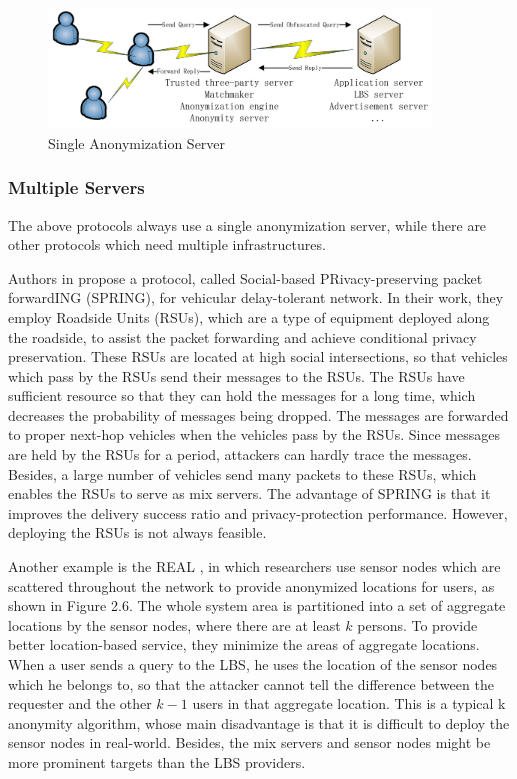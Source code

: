 \begin{figure} [H]
  \centering 
  \includegraphics[width=4.0in]{figures/Fig_Single_Ano_Ser.png}
  \caption{Single Anonymization Server} 
  \label{fig:SingleAnoymizationServer} %
\end{figure}

\subsubsection{ Multiple Servers}

\noindent The above protocols always use a single anonymization server, while there are other protocols which need multiple infrastructures. 

Authors in \cite{C25} propose a protocol, called Social-based PRivacy-preserving packet forwardING (SPRING), for vehicular delay-tolerant network. In their work, they employ Roadside Units (RSUs), which are a type of equipment deployed along the roadside, to assist the packet forwarding and achieve conditional privacy preservation. These RSUs are located at high social intersections, so that vehicles which pass by the RSUs send their messages to the RSUs. The RSUs have sufficient resource so that they can hold the messages for a long time, which decreases the probability of messages being dropped. The messages are forwarded to proper next-hop vehicles when the vehicles pass by the RSUs. Since messages are held by the RSUs for a period, attackers can hardly trace the messages. Besides, a large number of vehicles send many packets to these RSUs, which enables the RSUs to serve as mix servers. The advantage of SPRING is that it improves the delivery success ratio and privacy-protection performance. However, deploying the RSUs is not always feasible.

Another example is the REAL \cite{C26}, in which researchers use sensor nodes which are scattered throughout the network to provide anonymized locations for users, as shown in Figure 2.6. The whole system area is partitioned into a set of aggregate locations by the sensor nodes, where there are at least $k$ persons. To provide better location-based service, they minimize the areas of aggregate locations. When a user sends a query to the LBS, he uses the location of the sensor nodes which he belongs to, so that the attacker cannot tell the difference between the requester and the other $k-1$ users in that aggregate location. This is a typical k anonymity algorithm, whose main disadvantage is that it is difficult to deploy the sensor nodes in real-world. Besides, the mix servers and sensor nodes might be more prominent targets than the LBS providers.

